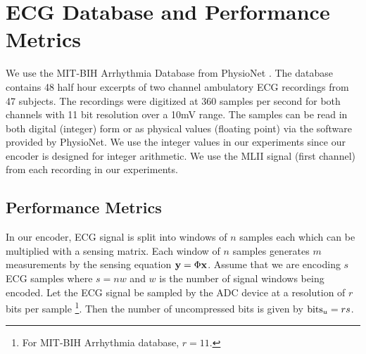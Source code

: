 \section{ECG Database and Performance Metrics}
\label{sec:data}

We use the MIT-BIH Arrhythmia Database \cite{moody2001impact}
from PhysioNet \cite{goldberger2000physiobank}.
The database contains 48 half hour excerpts of two channel
ambulatory ECG recordings from 47 subjects.
The recordings were digitized at 360 samples per second
for both channels with 11 bit resolution over a 10mV range.
The samples can be read in both digital (integer) form or
as physical values (floating point) via the software provided
by PhysioNet.
We use the integer values in our experiments since our
encoder is designed for integer arithmetic.
We use the MLII signal (first channel)
from each recording in our experiments.

\subsection{Performance Metrics}
\label{sec:codec:metrics}
In our encoder, ECG signal is split into windows
of $n$ samples each which can be multiplied
with a sensing matrix. Each window of $n$
samples generates $m$ measurements by the
sensing equation $\mathbf{y} = \Phi \mathbf{x}$.
Assume that we are encoding $s$ ECG samples where
$s = n w$ and $w$ is the number of signal windows
being encoded.
Let the ECG signal be sampled by the ADC device
at a resolution of $r$ bits per sample
\footnote{For MIT-BIH Arrhythmia database, $r=11$.}.
Then the number of uncompressed bits is given by
$\mathrm{bits}_u = r s$.

